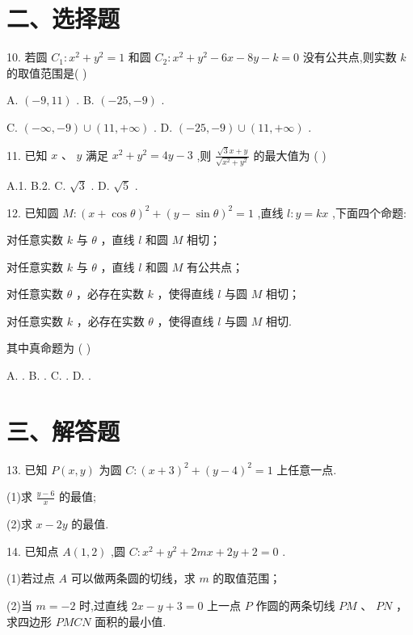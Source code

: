 \section*{二、选择题}

10. 若圆 ${C}_{1} : {x}^{2} + {y}^{2} = 1$ 和圆 ${C}_{2} : {x}^{2} + {y}^{2} - {6x} - {8y} - k = 0$ 没有公共点,则实数 $k$ 的取值范围是( )

A. $\left( {-9,{11}}\right)$ . B. $\left( {-{25}, - 9}\right)$ .

C. $\left( {-\infty , - 9}\right)  \cup  \left( {{11}, + \infty }\right)$ . D. $\left( {-{25}, - 9}\right)  \cup  \left( {{11}, + \infty }\right)$ .

11. 已知 $x\text{ 、 }y$ 满足 ${x}^{2} + {y}^{2} = {4y} - 3$ ,则 $\frac{\sqrt{3}x + y}{\sqrt{{x}^{2} + {y}^{2}}}$ 的最大值为 ( )

A.1. B.2. C. $\sqrt{3}$ . D. $\sqrt{5}$ .

12. 已知圆 $M : {\left( x + \cos \theta \right) }^{2} + {\left( y - \sin \theta \right) }^{2} = 1$ ,直线 $l : y = {kx}$ ,下面四个命题:

  对任意实数 $k$ 与 $\theta$ ，直线 $l$ 和圆 $M$ 相切；

  对任意实数 $k$ 与 $\theta$ ，直线 $l$ 和圆 $M$ 有公共点；

  对任意实数 $\theta$ ，必存在实数 $k$ ，使得直线 $l$ 与圆 $M$ 相切；

  对任意实数 $k$ ，必存在实数 $\theta$ ，使得直线 $l$ 与圆 $M$ 相切.

其中真命题为 ( )

A.     . B.     . C.     . D.     .

\section*{三、解答题}

13. 已知 $P\left( {x,y}\right)$ 为圆 $C : {\left( x + 3\right) }^{2} + {\left( y - 4\right) }^{2} = 1$ 上任意一点.

(1)求 $\frac{y - 6}{x}$ 的最值;

(2)求 $x - {2y}$ 的最值.

14. 已知点 $A\left( {1,2}\right)$ ,圆 $C : {x}^{2} + {y}^{2} + {2mx} + {2y} + 2 = 0$ .

(1)若过点 $A$ 可以做两条圆的切线，求 $m$ 的取值范围；

(2)当 $m =  - 2$ 时,过直线 ${2x} - y + 3 = 0$ 上一点 $P$ 作圆的两条切线 ${PM}$ 、 ${PN}$ ，求四边形 ${PMCN}$ 面积的最小值.

